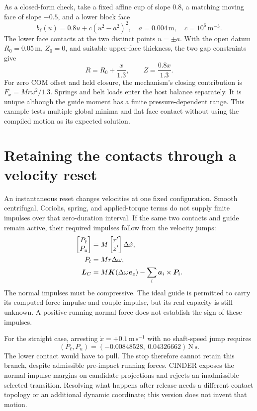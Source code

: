 \documentclass[11pt,letterpaper]{article}
\numberwithin{equation}{section}
\begin{document}
As a closed-form check, take a fixed affine cup of slope $0.8$, a matching
moving face of slope $-0.5$, and a lower block face
\begin{equation}
 b_\ell(u)=0.8u+c(u^2-a^2)^2,
 \quad a=0.004\,\mathrm m,\quad c=10^6\,\mathrm{m^{-3}}.
\end{equation}
The lower face contacts at the two distinct points $u=\pm a$.
With the open datum $R_0=0.05\,\mathrm m$, $Z_0=0$, and suitable upper-face
thickness, the two gap constraints give
\begin{equation}
 R=R_0+\frac{x}{1.3},\qquad Z=\frac{0.8x}{1.3}.
\end{equation}
For zero COM offset and held closure, the mechanism's closing contribution is
$F_x=Mr\omega^2/1.3$. Springs and belt loads enter the host balance separately. It is unique although the guide moment has a finite
pressure-dependent range. This example tests multiple global minima and flat
face contact without using the compiled motion as its expected solution.

\section{Retaining the contacts through a velocity reset}
\label{sec:impact}

An instantaneous reset changes velocities at one fixed configuration. Smooth
centrifugal, Coriolis, spring, and applied-torque terms do not supply finite
impulses over that zero-duration interval. If the same two contacts and guide
remain active, their required impulses follow from the velocity jumps:
\begin{align}
 [\bm n_\ell\ \bm n_u]
 \begin{bmatrix}P_\ell\\P_u\end{bmatrix}
   &=M\begin{bmatrix}r'\\z'\end{bmatrix}\Delta\dot x,\\
 P_t&=Mr\Delta\omega,\\
 \bm L_C&=M\bm K(\Delta\omega\ez)
             -\sum_i\bm a_i\times\bm P_i.
 \label{eq:impulse}
\end{align}
The normal impulses must be compressive. The ideal guide is permitted to carry
its computed force impulse and couple impulse, but its real capacity is still
unknown. A positive running normal force does not establish the sign of these
impulses.

For the straight case, arresting $\dot x=+0.1\,\mathrm{m\,s^{-1}}$ with no
shaft-speed jump requires
\begin{equation}
 (P_\ell,P_u)=(-0.00848528,\ 0.04326662)\,\mathrm{N\,s}.
\end{equation}
The lower contact would have to pull. The stop therefore cannot retain this
branch, despite admissible pre-impact running forces. CINDER exposes the
normal-impulse margins on candidate projections and rejects an inadmissible
selected transition. Resolving what happens after release needs a different
contact topology or an additional dynamic coordinate; this version does not
invent that motion.
\end{document}
